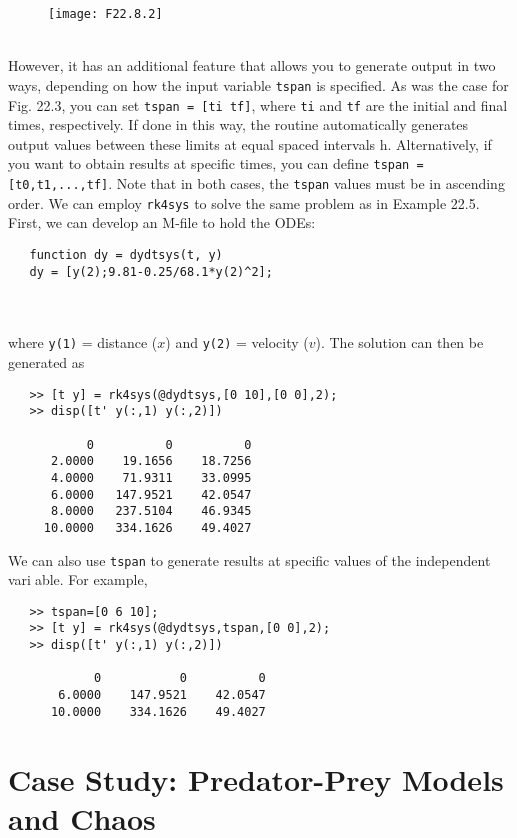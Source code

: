 \begin{figure}[hbt!]
	\texttt{[image: F22.8.2]}
	\label{F22.8.2}
\end{figure}\\

However, it has an additional feature that allows you to generate output in two ways,
depending on how the input variable \texttt{tspan} is specified. As was the case for Fig. 22.3, you
can set \texttt{tspan = [ti tf]}, where \texttt{ti} and \texttt{tf} are the initial and final times, respectively.
If done in this way, the routine automatically generates output values between these limits
at equal spaced intervals h. Alternatively, if you want to obtain results at specific times, you
can define \texttt{tspan = [t0,t1,...,tf]}. Note that in both cases, the \texttt{tspan} values must
be in ascending order.
We can employ \texttt{rk4sys} to solve the same problem as in Example 22.5. First, we can
develop an M-file to hold the ODEs:

\begin{verbatim}
   function dy = dydtsys(t, y)
   dy = [y(2);9.81-0.25/68.1*y(2)^2];
\end{verbatim}\\
\\
where \texttt{y(1)} = distance ($x$) and \texttt{y(2)} = velocity ($v$). The solution can then be generated as

\begin{verbatim}
   >> [t y] = rk4sys(@dydtsys,[0 10],[0 0],2);
   >> disp([t' y(:,1) y(:,2)])
   
           0          0          0
      2.0000    19.1656    18.7256
      4.0000    71.9311    33.0995
      6.0000   147.9521    42.0547
      8.0000   237.5104    46.9345
     10.0000   334.1626    49.4027
\end{verbatim}

We can also use \texttt{tspan} to generate results at specific values of the independent variable. For example,

\begin{verbatim}
   >> tspan=[0 6 10];
   >> [t y] = rk4sys(@dydtsys,tspan,[0 0],2);
   >> disp([t' y(:,1) y(:,2)])

            0           0          0
       6.0000    147.9521    42.0547
      10.0000    334.1626    49.4027
\end{verbatim}

\section{Case Study: Predator-Prey Models and Chaos}

